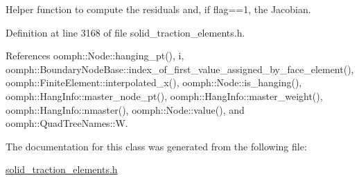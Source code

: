 Helper function to compute the residuals and, if flag==1, the Jacobian. 



Definition at line 3168 of file solid\+\_\+traction\+\_\+elements.\+h.



References oomph\+::\+Node\+::hanging\+\_\+pt(), i, oomph\+::\+Boundary\+Node\+Base\+::index\+\_\+of\+\_\+first\+\_\+value\+\_\+assigned\+\_\+by\+\_\+face\+\_\+element(), oomph\+::\+Finite\+Element\+::interpolated\+\_\+x(), oomph\+::\+Node\+::is\+\_\+hanging(), oomph\+::\+Hang\+Info\+::master\+\_\+node\+\_\+pt(), oomph\+::\+Hang\+Info\+::master\+\_\+weight(), oomph\+::\+Hang\+Info\+::nmaster(), oomph\+::\+Node\+::value(), and oomph\+::\+Quad\+Tree\+Names\+::W.



The documentation for this class was generated from the following file\+:\begin{DoxyCompactItemize}
\item 
\hyperlink{solid__traction__elements_8h}{solid\+\_\+traction\+\_\+elements.\+h}\end{DoxyCompactItemize}
